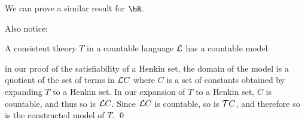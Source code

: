 We can prove a similar result for $\bR$.

Also notice:

\bthrm[title=Intermediate L\"owenheim-Skolem]

    A consistent theory $T$ in a countable language ${\cal L}$ has a countable model.

\ethrm

\Proof in our proof of the satisfiability of a Henkin set, the domain of the model is a quotient of the set of terms in ${\cal L}C$
where $C$ is a set of constants obtained by expanding $T$ to a Henkin set.
In our expansion of $T$ to a Henkin set, $C$ is countable, and thus so is ${\cal L}C$.
Since ${\cal L}C$ is countable, so is ${\cal T}C$, and therefore so is the constructed model of $T$.
\qed

